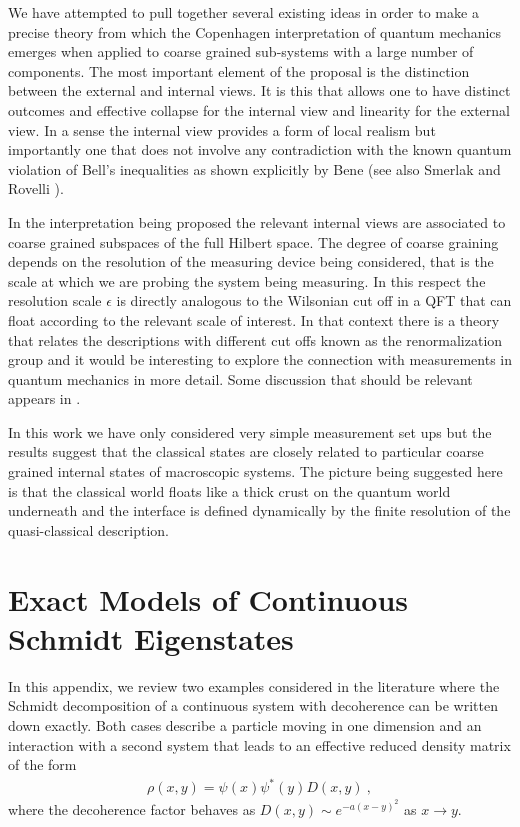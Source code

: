 \documentclass[12pt]{article}
\newcommand{\EQ}[1]{\begin{equation}\begin{split} #1
\end{split}\end{equation}}
\begin{document}
We have attempted to pull together several existing ideas in order to make a precise theory from which the Copenhagen interpretation of quantum mechanics emerges when applied to coarse grained sub-systems with a large number of components. The most important element of the proposal is the distinction between the external and internal views. It is this that allows one to have distinct outcomes and effective collapse for the internal view and linearity for the external view. In a sense the internal view provides a form of local realism but importantly one that does not involve any contradiction with the known quantum violation of Bell's inequalities as shown explicitly by Bene \cite{Bene:1997mf} (see also Smerlak and Rovelli \cite{Smerlak:2006gi}). 

In the interpretation being proposed the relevant internal views are associated to coarse grained subspaces of the full Hilbert space. The degree of coarse graining depends on the resolution of the measuring device being considered, that is the scale at which we are probing the system being measuring. In this respect the resolution scale $\epsilon$ is directly analogous to the Wilsonian cut off in a QFT that can float according to the relevant scale of interest. In that context there is a theory that relates the descriptions with different cut offs known as the renormalization group and it would be interesting to explore the connection with measurements in quantum mechanics in more detail. Some discussion that should be relevant appears in \cite{Balasubramanian:2011wt}.

In this work we have only considered very simple measurement set ups but the results suggest that the classical states are 
closely related to particular coarse grained internal states of macroscopic systems. The picture being suggested here is that the classical world floats like a thick crust on the quantum world underneath and the interface is defined dynamically by the finite resolution of the quasi-classical description.

\appendix
\appendixpage


\section{Exact Models of Continuous Schmidt Eigenstates}\label{a1}

In this appendix, we review two examples considered in the literature where the Schmidt decomposition of 
a continuous system with decoherence 
can be written down exactly. Both cases describe a particle moving in one dimension and an interaction with a second system that leads to an effective reduced density matrix of the form
\EQ{
\rho(x,y)=\psi(x)\psi^*(y)D(x,y)\ ,
}
where the decoherence factor behaves as
$D(x,y)\sim e^{-a(x-y)^2}$ as $x\to y$.
\end{document}
